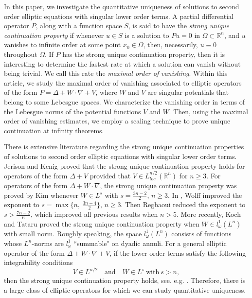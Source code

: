 \documentclass[11pt]{amsart}
\theoremstyle{plain}
\numberwithin{equation}{section}
\begin{document}
In this paper, we investigate the quantitative uniqueness of solutions to second order elliptic equations with singular lower order terms.
A partial differential operator $P$, along with a function space $S$, is said to have the {\em strong unique continuation property} if whenever $u \in S$ is a solution to $P u = 0$ in ${\Omega} {\subset} {\ensuremath{\mathbb{R}}}^n$, and $u$ vanishes to infinite order at some point $x_0 \in {\Omega}$, then, necessarily, $u \equiv 0$ throughout ${\Omega}$.
If $P$ has the strong unique continuation property, then it is interesting to determine the fastest rate at which a solution can vanish without being trivial.
We call this rate the {\em maximal order of vanishing}.
 Within this article, we study the maximal order of vanishing associated to elliptic operators of the form $P = {\Delta} + W \cdot {\nabla} + V$, where $W$ and $V$ are singular potentials that belong to some Lebesgue spaces.
We characterize the vanishing order in terms of the Lebesgue norms of the potential functions $V$ and $W$.
Then, using the maximal order of vanishing estimates, we employ a scaling technique to prove unique continuation at infinity theorems.

There is extensive literature regarding the strong unique continuation properties of solutions to second order elliptic equations with singular lower order terms.
Jerison and Kenig \cite{JK85} proved that the strong unique continuation property holds for operators of the form ${\Delta}+ V$ 
provided that $V \in L^{n/2}_{loc}{\left( {{\ensuremath{\mathbb{R}}}^n} \right) }$ for $n \ge 3$.
For operators of the form ${\Delta} + W \cdot {\nabla}$, the strong unique continuation property was proved by Kim \cite{Kim89} whenever $W\in L^{s}$ with $s=\frac{3n-2}{2}$, $n \ge 3$.
In \cite{Wol90}, Wolff improved the exponent to $s=\max\{n, \ \frac{3n-4}{2}\}$, $n \ge 3$.
Then Regbaoui \cite{Reg99} reduced the exponent to $s >\frac{7n-2}{6}$, which improved all previous results when $n > 5$.
More recently, Koch and Tataru \cite{KT01} proved the strong unique continuation property when $W\in l^1_{\omega}(L^n)$ with small norm.
Roughly speaking, the space $l^1_\omega (L^n)$ consists of functions whose $L^n$-norms are $l^1_\omega$ ``summable"  on dyadic annuli.
For a general elliptic operator of the form ${\Delta} + W \cdot {\nabla} + V$, if the lower order terms satisfy the following integrability conditions
$$ V\in L^{n/2} \quad \mbox{and} \quad W\in L^{s} \ \mbox{with} \ s>n, $$
then the strong unique continuation property holds, see. e.g. \cite{KT01}.
Therefore, there is a large class of elliptic operators for which we can study quantitative uniqueness.
\end{document}

